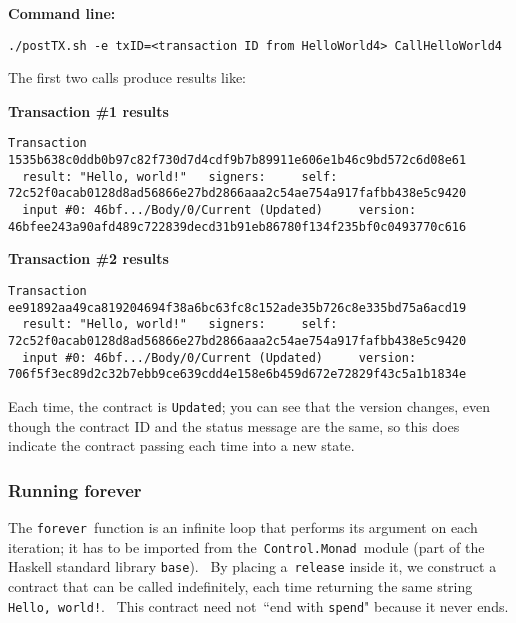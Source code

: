 \documentclass[11pt]{article}
\newcommand{\codeblock}[1]{\begin{mdframed}[
    backgroundcolor=header-color,
    linecolor=header-color,
    innertopmargin=10pt,
    ]{\texttt{#1}}\end{mdframed}}
\begin{document}
\textbf{Command line:}

\codeblock{.\slash{}postTX.sh -e txID=\textless{}transaction ID from HelloWorld4\textgreater{} CallHelloWorld4}

The first two calls produce results like:


\vspace{11pt}

\textbf{Transaction \#1 results}

\codeblock{Transaction 1535b638c0ddb0b97c82f730d7d4cdf9b7b89911e606e1b46c9bd572c6d08e61\newline
  result: "Hello, world!"\newline
  signers:\newline
    self: 72c52f0acab0128d8ad56866e27bd2866aaa2c54ae754a917fafbb438e5c9420\newline
  input \#0: 46bf...\slash{}Body\slash{}0\slash{}Current (Updated)\newline
    version: 46bfee243a90afd489c722839decd31b91eb86780f134f235bf0c0493770c616}

\textbf{Transaction \#2 results}

\codeblock{Transaction ee91892aa49ca819204694f38a6bc63fc8c152ade35b726c8e335bd75a6acd19\newline
  result: "Hello, world!"\newline
  signers:\newline
    self: 72c52f0acab0128d8ad56866e27bd2866aaa2c54ae754a917fafbb438e5c9420\newline
  input \#0: 46bf...\slash{}Body\slash{}0\slash{}Current (Updated)\newline
    version: 706f5f3ec89d2c32b7ebb9ce639cdd4e158e6b459d672e72829f43c5a1b1834e}

Each time, the contract is \texttt{Updated}; you can see that the version changes, even though the contract ID and the status message are the same, so this does indicate the contract passing each time into a new state.

\subsubsection{Running forever}
\vspace{5.5pt}

The \texttt{forever} function is an infinite loop that performs its argument on each iteration; it has to be imported from the \texttt{Control.Monad} module (part of the Haskell standard library \texttt{base}).  By placing a \texttt{release} inside it, we construct a contract that can be called indefinitely, each time returning the same string \texttt{Hello, world!}.  This contract need not “end with \texttt{spend}" because it never ends.
\end{document}
